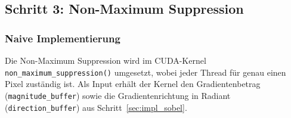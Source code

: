 \subsection{Schritt 3: Non-Maximum Suppression}
\label{sec:impl_non-maximum-suppression}

\subsubsection{Naive Implementierung}

Die Non-Maximum Suppression wird im CUDA-Kernel
\texttt{non\_maximum\_suppression()} umgesetzt, wobei jeder Thread für
genau einen Pixel zuständig ist. Als Input erhält der Kernel den
Gradientenbetrag (\texttt{magnitude\_buffer}) sowie die
Gradientenrichtung in Radiant (\texttt{direction\_buffer}) aus
Schritt~\ref{sec:impl_sobel}.

